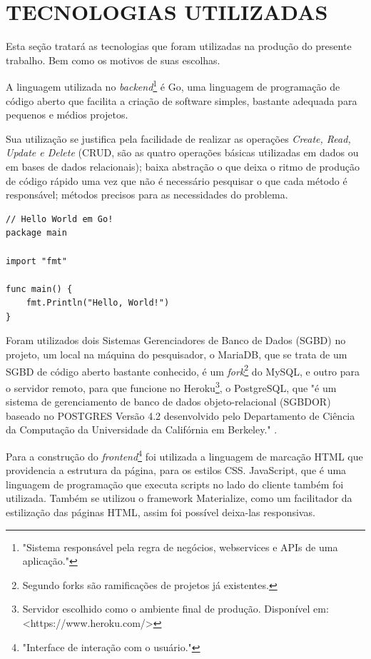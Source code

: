 \section{TECNOLOGIAS UTILIZADAS}\label{tec}

Esta seção tratará as tecnologias que foram utilizadas na produção do presente trabalho. Bem como os motivos de suas escolhas.

A linguagem utilizada no \textit{backend}\footnote{"Sistema responsável pela regra de negócios, webservices e APIs de uma aplicação."\cite{lamim14}} é Go, uma linguagem de programação de código aberto que facilita a criação de software simples, bastante adequada para pequenos e médios projetos.

Sua utilização se justifica pela facilidade de realizar as operações \textit{Create, Read, Update e Delete} (CRUD, são as quatro operações básicas utilizadas em dados ou em bases de dados relacionais); baixa abstração o que deixa o ritmo de produção de código rápido uma vez que não é necessário pesquisar o que cada método é responsável; métodos precisos para as necessidades do problema.
\begin{lstlisting}
// Hello World em Go!
package main

import "fmt"

func main() {
	fmt.Println("Hello, World!")
}
\end{lstlisting}

Foram utilizados dois Sistemas Gerenciadores de Banco de Dados (SGBD) no projeto, um local na máquina do pesquisador, o MariaDB, que se trata de um SGBD de código aberto bastante conhecido, é um \textit{fork}\footnote{Segundo  forks são ramificações de projetos já existentes.} do MySQL, e outro para o servidor remoto, para que funcione no Heroku\footnote{Servidor escolhido como o ambiente final de produção. Disponível em:
<https://www.heroku.com/>}, o PostgreSQL, que "é um sistema de gerenciamento de banco de dados objeto-relacional (SGBDOR) baseado no POSTGRES Versão 4.2 desenvolvido pelo Departamento de Ciência da Computação da Universidade da Califórnia em Berkeley."  \cite{postgres07}.

Para a construção do \textit{frontend}\footnote{"Interface de interação com o usuário."\cite{lamim14}} foi utilizada a linguagem de marcação HTML que providencia a estrutura da página, para os estilos CSS. JavaScript, que é uma linguagem de programação que executa scripts no lado do cliente também foi utilizada. Também se utilizou o framework Materialize, como um facilitador da estilização das páginas HTML, assim foi possível deixa-las responsivas.

